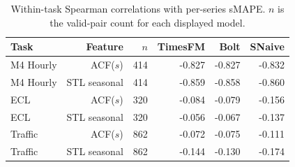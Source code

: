 \begin{table}[!htbp]
\centering
\caption{Within-task Spearman correlations with per-series sMAPE. $n$ is the valid-pair count for each displayed model. }
\label{tab:corrsmape}
\small
\setlength{\tabcolsep}{3.5pt}
\begin{tabular}{lrrrrr}
\hline
Task & Feature & $n$ & TimesFM & Bolt & SNaive \\
\hline
M4 Hourly & ACF($s$) & 414 & -0.827 & -0.827 & -0.832 \\
M4 Hourly & STL seasonal & 414 & -0.859 & -0.858 & -0.860 \\
ECL & ACF($s$) & 320 & -0.084 & -0.079 & -0.156 \\
ECL & STL seasonal & 320 & -0.056 & -0.067 & -0.137 \\
Traffic & ACF($s$) & 862 & -0.072 & -0.075 & -0.111 \\
Traffic & STL seasonal & 862 & -0.144 & -0.130 & -0.174 \\
\hline
\end{tabular}
\end{table}
